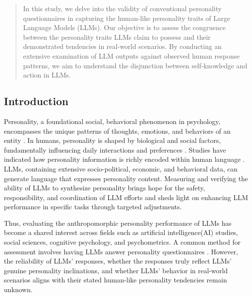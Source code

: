 \documentclass{article}
\theoremstyle{plain}
\theoremstyle{definition}
\theoremstyle{remark}
\begin{document}
\printAffiliationsAndNotice{}  %

\begin{abstract}
In this study, we delve into the validity of conventional personality questionnaires in capturing the human-like personality traits of Large Language Models (LLMs). Our objective is to assess the congruence between the personality traits LLMs claim to possess and their demonstrated tendencies in real-world scenarios. By conducting an extensive examination of LLM outputs against observed human response patterns, we aim to understand the disjunction between self-knowledge and action in LLMs.
\end{abstract}

\begin{CJK*}{UTF8}{gbsn}
\section{Introduction}

Personality, a foundational social, behavioral phenomenon in psychology, encompasses the unique patterns of thoughts, emotions, and behaviors of an entity \citep{allport1937personality, roberts2022personality}. In humans, personality is shaped by biological and social factors, fundamentally influencing daily interactions and preferences \citep{roberts2007power}. Studies have indicated how personality information is richly encoded within human language \citep{goldberg1981language, saucier2001lexical}. LLMs, containing extensive socio-political, economic, and behavioral data, can generate language that expresses personality content. Measuring and verifying the ability of LLMs to synthesize personality brings hope for the safety, responsibility, and coordination of LLM efforts \citep{gabriel2020artificial} and sheds light on enhancing LLM performance in specific tasks through targeted adjustments.

Thus, evaluating the anthropomorphic personality performance of LLMs has become a shared interest across fields such as artificial intelligence(AI) studies, social sciences, cognitive psychology, and psychometrics. A common method for assessment involves having LLMs answer personality questionnaires \citep{huang2024chatgpt}. However, the reliability of LLMs' responses, whether the responses truly reflect LLMs' genuine personality inclinations, and whether LLMs' behavior in real-world scenarios aligns with their stated human-like personality tendencies remain unknown.


\end{CJK*}
\end{document}
